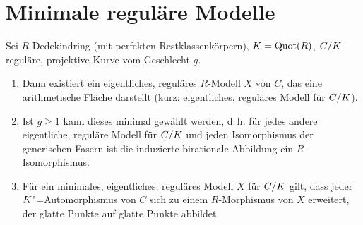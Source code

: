 \documentclass[german]{scrreprt}
\begin{document}
\section{Minimale reguläre Modelle}
\begin{Satz}
  Sei $R$ Dedekindring (mit perfekten Restklassenkörpern),
  $K=\operatorname{Quot}(R)$,
  $C/K$ reguläre, projektive Kurve vom Geschlecht $g$.
  \begin{enumerate}[label=(\roman*)]
  \item\cite[Proposition IV.4.5(a)]{silverman2}
    Dann existiert ein eigentliches, reguläres $R$-Modell $X$ von $C$,
    das eine arithmetische Fläche darstellt
    (kurz: eigentliches, reguläres Modell für $C/K$).
  \item\cite[Proposition IV.4.5(b)]{silverman2} Ist $g\geq1$ kann
    dieses minimal gewählt werden, d.\,h.
    für jedes andere eigentliche, reguläre Modell für $C/K$ und jeden
    Isomorphismus der generischen Fasern ist die induzierte birationale
    Abbildung
    ein $R$-Isomorphismus.
  \item\cite[Proposition IV.4.6]{silverman2}
    Für ein minimales, eigentliches, reguläres Modell $X$ für $C/K$
    gilt, dass jeder $K$"=Automorphismus von $C$ sich zu einem
    $R$-Morphismus von $X$ erweitert, der glatte Punkte auf glatte
    Punkte abbildet.
  \end{enumerate}
\end{Satz}

\end{document}

